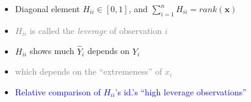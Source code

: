 \documentclass[xcolor={dvipsnames}]{beamer}
\begin{document}
{\vspace{-1.5em}
\begin{itemize}
\item<2-> Diagonal element $H_{ii} \in [0, 1]$, and $\sum_{i=1}^n H_{ii} = rank(\textbf{x})$
\item<2->[] \textcolor{gray}{$H_{ii}$ is called the \emph{leverage} of observation $i$}
\item<3-> $H_{ii}$ shows much $\hat Y_i$ depends on $Y_i$ 
\item<3->[] \textcolor{gray}{which depends on the ``extremeness'' of $x_i$} 
\item<5->  \textcolor{blue}{Relative comparison of $H_{ii}$'s id.'s ``high leverage observations'' }
\end{itemize}


}
\end{document}
